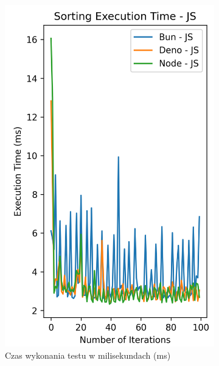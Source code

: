 \begin{figure}[H]
  \centering
  \begin{subfigure}[b]{0.4\textwidth}
    \centering
    \includegraphics[width=\textwidth]{Figures/sorting/sorting_quick_100_10000_js_time.png}
    \caption{Czas wykonania testu w milisekundach (ms)}
    \label{fig:quick_sorting_e3_time}
  \end{subfigure}
  \begin{subfigure}[b]{0.4\textwidth}
    \centering

\end{subfigure}
\end{figure}
